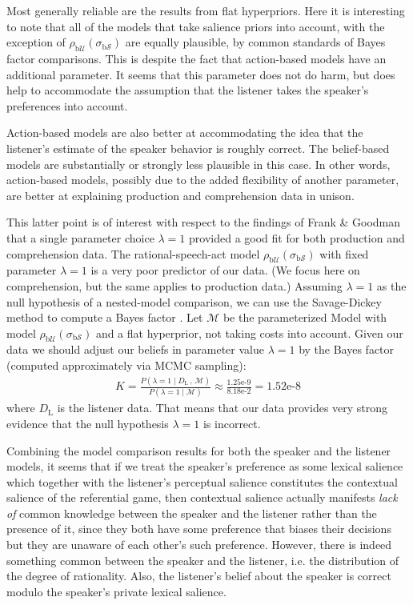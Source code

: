 Most generally reliable are the results from flat hyperpriors. Here it
is interesting to note that all of the models that take salience
priors into account, with the exception of
$\rho_{\mathrm{b}\mathcal{U}}(\sigma_{\mathrm{b}\mathcal{S}})$ are
equally plausible, by common standards of Bayes factor
comparisons. This is despite the fact that action-based models have an
additional parameter. It seems that this parameter does not do harm,
but does help to accommodate the assumption that the listener takes
the speaker's preferences into account. 

Action-based models are also better at accommodating the idea that the
listener's estimate of the speaker behavior is roughly correct. The
belief-based models are substantially or strongly less plausible in
this case. In other words, action-based models, possibly due to the
added flexibility of another parameter, are better at explaining
production and comprehension data in unison.

This latter point is of interest with respect to the findings of Frank
\& Goodman that a single parameter choice $\lambda=1$ provided a good
fit for both production and comprehension data. The
rational-speech-act model
$\rho_{\mathrm{b}\mathcal{U}}(\sigma_{\mathrm{b}\mathcal{S}})$ with
fixed parameter $\lambda=1$ is a very poor predictor of our data. (We
focus here on comprehension, but the same applies to production data.)
Assuming $\lambda =1$ as the null hypothesis of a nested-model
comparison, we can use the Savage-Dickey method to compute a Bayes
factor
\cite{DickeyLientz1970:The-Weighted-Li,WagenmakersLodewyckx2010:Bayesian-hypoth}. Let
$\mathcal{M}$ be the parameterized Model with model
$\rho_{\mathrm{b}\mathcal{U}}(\sigma_{\mathrm{b}\mathcal{S}})$ and a
flat hyperprior, not taking costs into account. Given our data we
should adjust our beliefs in parameter value $\lambda=1$ by the Bayes
factor (computed approximately via MCMC sampling):
\begin{align*}
  K = \frac{P(\lambda=1 \mid D_\mathrm{L} \, , \, \mathcal{M})}{P(\lambda=1
    \mid \mathcal{M})} \approx \frac{1.25\text{e-9}}{8.18\text{e-2}} =
  1.52\text{e-8} 
\end{align*}
where $D_\mathrm{L}$ is the listener data. That means that our data
provides very strong evidence that the null hypothesis $\lambda=1$ is
incorrect.

\bigskip

Combining the model comparison results for both the speaker and the
listener models, it seems that if we treat the speaker's preference as
some lexical salience which together with the listener's perceptual
salience constitutes the contextual salience of the referential game,
then contextual salience actually manifests \emph{lack of} common
knowledge between the speaker and the listener rather than the
presence of it, since they both have some preference that biases their
decisions but they are unaware of each other's such
preference. However, there is indeed something common between the
speaker and the listener, i.e. the distribution of the degree of
rationality. Also, the listener's belief about the speaker is correct
modulo the speaker's private lexical salience.


